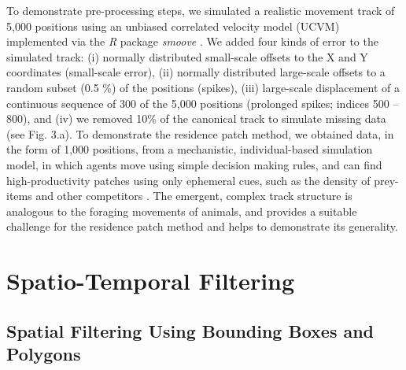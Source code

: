 \begin{refsection}
    To demonstrate pre-processing steps, we simulated a realistic movement track of 5,000 positions using an unbiased correlated velocity model (UCVM) implemented via the \textit{R} package \textit{smoove} \citep[][see Fig. 3.a]{gurarie2017}.
    We added four kinds of error to the simulated track: (i) normally distributed small-scale offsets to the X and Y coordinates (small-scale error), (ii) normally distributed large-scale offsets to a random subset (0.5 \%) of the positions (spikes), (iii) large-scale displacement of a continuous sequence of 300 of the 5,000 positions (prolonged spikes; indices 500 -- 800), and (iv) we removed 10\% of the canonical track to simulate missing data (see Fig. 3.a).
    To demonstrate the residence patch method, we obtained data, in the form of 1,000 positions, from a mechanistic, individual-based simulation model, in which agents move using simple decision making rules, and can find high-productivity patches using only ephemeral cues, such as the density of prey-items and other competitors \citep{gupte2021a, netz2021}.
    The emergent, complex track structure is analogous to the foraging movements of animals, and provides a suitable challenge for the residence patch method and helps to demonstrate its generality.

    \section*{Spatio-Temporal Filtering}

    \subsection*{Spatial Filtering Using Bounding Boxes and Polygons}


\end{refsection}
